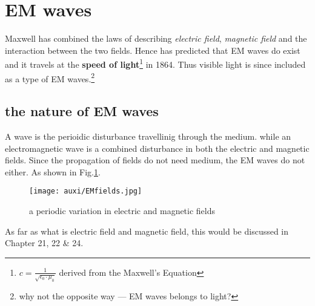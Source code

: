 \documentclass[a4paper]{tufte-handout}
\begin{document}
\section{EM waves}
Maxwell has combined the laws of describing \emph{electric field}, \emph{magnetic field} and the interaction between the two fields. Hence has predicted that EM waves do exist and it travels at the \textbf{speed of light}\footnote{$c=\frac{1}{\sqrt{\epsilon_0\cdot\mu_0}}$ derived from the Maxwell's Equation} in 1864. Thus visible light is since included as a type of EM waves.\footnote{why not the opposite way --- EM waves belongs to light?}

\subsection{the nature of EM waves}
A wave is the perioidic disturbance travellinig through the medium. while an electromagnetic wave is a combined disturbance in both the electric and magnetic fields. Since the propagation of fields do not need medium, the EM waves do not either. As shown in Fig.\ref{fig:EM fields}. 
\begin{figure}[h]
\centering
\texttt{[image: auxi/EMfields.jpg]}
\caption{a periodic variation in electric and magnetic fields}
\label{fig:EM fields}
\end{figure}
As far as what is electric field and magnetic field, this would be discussed in Chapter 21, 22 \& 24. 
\end{document}
